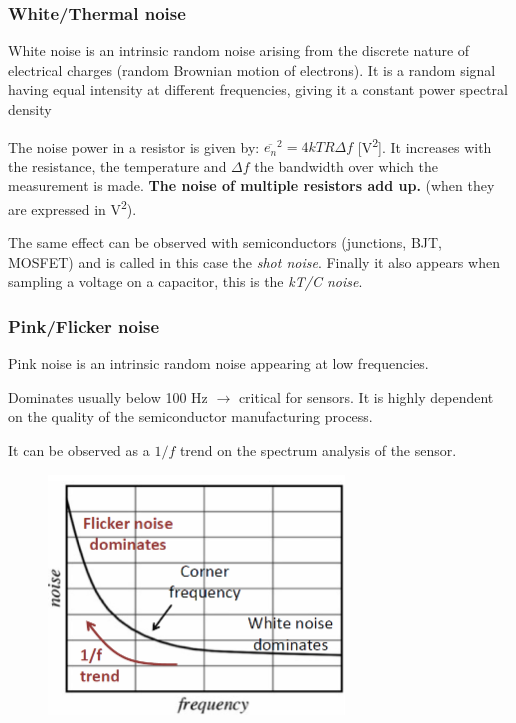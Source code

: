 \subsubsection{White/Thermal noise}

\begin{mydef}
White noise is an intrinsic random noise arising from the discrete
nature of electrical charges (random
Brownian motion of electrons). It is a random signal having equal intensity at different frequencies, giving it a constant power spectral density
\end{mydef}

The noise power in a resistor is given by: $\overline{e_n}^2 = 4k TR\Delta f$ [\si{V^2}]. It increases with the resistance, the temperature and $\Delta f$ the bandwidth over which the measurement is made. \textbf{The noise of multiple resistors add up.} (when they are expressed in \si{V^2}).

The same effect can be observed with semiconductors (junctions, BJT, MOSFET) and is called in this case the \textit{shot noise}. Finally it also appears when sampling a voltage on a capacitor, this is the \textit{kT/C noise}.

\subsubsection{Pink/Flicker noise}

\begin{mydef}
Pink noise is an intrinsic random noise appearing at low frequencies.
\end{mydef}

\begin{minipage}{0.45 \linewidth}
Dominates usually below 100 Hz $\rightarrow$ critical for sensors. It is highly dependent on the quality of the semiconductor
manufacturing process.

It can be observed as a $1/f$ trend on the spectrum analysis of the sensor.
\end{minipage}\hfill
\begin{minipage}{0.45 \linewidth}
\begin{figure}[H]
    \centering
    \includegraphics[width = 0.7\textwidth]{L3/img/pink-noise.PNG}
\end{figure}
\end{minipage}

